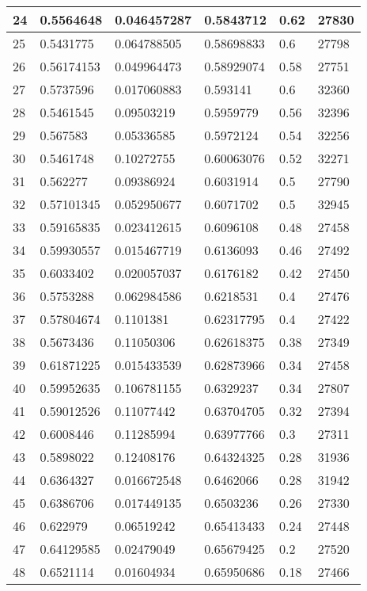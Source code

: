 \begin{longtable}{|l|l|l|l|l|l|}
24 & 0.5564648 & 0.046457287 & 0.5843712 & 0.62 & 27830 \\ \hline 
25 & 0.5431775 & 0.064788505 & 0.58698833 & 0.6 & 27798 \\ \hline 
26 & 0.56174153 & 0.049964473 & 0.58929074 & 0.58 & 27751 \\ \hline 
27 & 0.5737596 & 0.017060883 & 0.593141 & 0.6 & 32360 \\ \hline 
28 & 0.5461545 & 0.09503219 & 0.5959779 & 0.56 & 32396 \\ \hline 
29 & 0.567583 & 0.05336585 & 0.5972124 & 0.54 & 32256 \\ \hline 
30 & 0.5461748 & 0.10272755 & 0.60063076 & 0.52 & 32271 \\ \hline 
31 & 0.562277 & 0.09386924 & 0.6031914 & 0.5 & 27790 \\ \hline 
32 & 0.57101345 & 0.052950677 & 0.6071702 & 0.5 & 32945 \\ \hline 
33 & 0.59165835 & 0.023412615 & 0.6096108 & 0.48 & 27458 \\ \hline 
34 & 0.59930557 & 0.015467719 & 0.6136093 & 0.46 & 27492 \\ \hline 
35 & 0.6033402 & 0.020057037 & 0.6176182 & 0.42 & 27450 \\ \hline 
36 & 0.5753288 & 0.062984586 & 0.6218531 & 0.4 & 27476 \\ \hline 
37 & 0.57804674 & 0.1101381 & 0.62317795 & 0.4 & 27422 \\ \hline 
38 & 0.5673436 & 0.11050306 & 0.62618375 & 0.38 & 27349 \\ \hline 
39 & 0.61871225 & 0.015433539 & 0.62873966 & 0.34 & 27458 \\ \hline 
40 & 0.59952635 & 0.106781155 & 0.6329237 & 0.34 & 27807 \\ \hline 
41 & 0.59012526 & 0.11077442 & 0.63704705 & 0.32 & 27394 \\ \hline 
42 & 0.6008446 & 0.11285994 & 0.63977766 & 0.3 & 27311 \\ \hline 
43 & 0.5898022 & 0.12408176 & 0.64324325 & 0.28 & 31936 \\ \hline 
44 & 0.6364327 & 0.016672548 & 0.6462066 & 0.28 & 31942 \\ \hline 
45 & 0.6386706 & 0.017449135 & 0.6503236 & 0.26 & 27330 \\ \hline 
46 & 0.622979 & 0.06519242 & 0.65413433 & 0.24 & 27448 \\ \hline 
47 & 0.64129585 & 0.02479049 & 0.65679425 & 0.2 & 27520 \\ \hline 
48 & 0.6521114 & 0.01604934 & 0.65950686 & 0.18 & 27466 \\ \hline 

\end{longtable}

